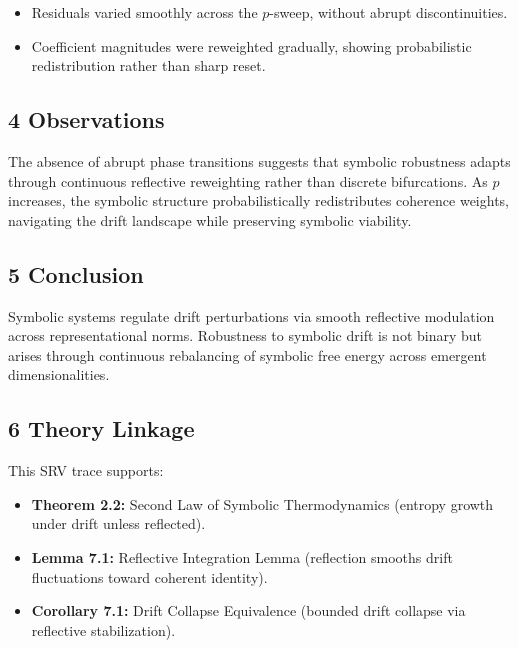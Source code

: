 \begin{itemize}
    \item Residuals varied smoothly across the $p$-sweep, without abrupt discontinuities.
    \item Coefficient magnitudes were reweighted gradually, showing probabilistic redistribution rather than sharp reset.
\end{itemize}

\subsection*{4 Observations}
\label{subsection:trace3_observations}

The absence of abrupt phase transitions suggests that symbolic robustness adapts through continuous reflective reweighting rather than discrete bifurcations. As $p$ increases, the symbolic structure probabilistically redistributes coherence weights, navigating the drift landscape while preserving symbolic viability.

\subsection*{5 Conclusion}
\label{subsection:trace3_conclusion}

Symbolic systems regulate drift perturbations via smooth reflective modulation across representational norms. Robustness to symbolic drift is not binary but arises through continuous rebalancing of symbolic free energy across emergent dimensionalities.

\subsection*{6 Theory Linkage}
\label{subsection:trace3_theory_linkage}

This SRV trace supports:
\begin{itemize}
    \item \textbf{Theorem 2.2:} Second Law of Symbolic Thermodynamics (entropy growth under drift unless reflected).
    \item \textbf{Lemma 7.1:} Reflective Integration Lemma (reflection smooths drift fluctuations toward coherent identity).
    \item \textbf{Corollary 7.1:} Drift Collapse Equivalence (bounded drift collapse via reflective stabilization).
\end{itemize}
